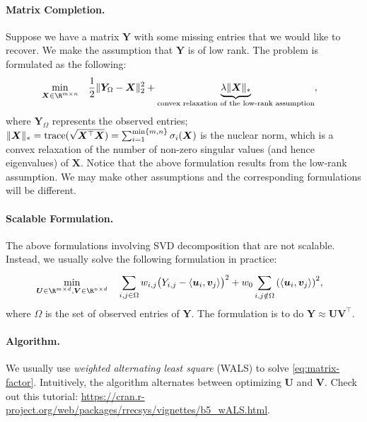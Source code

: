 {        \paragraph{Matrix Completion.} 
        Suppose we have a matrix $\bm{Y}$ with some missing entries that we would like to recover. 
        We make the assumption that $\bm{Y}$ is of low rank.
        The problem is formulated as the following:
            \begin{equation}
                \begin{aligned}
                            & \min_{\bm{X} \in \R^{m \times n}} & & \frac{1}{2}\norm{\bm{Y}_\Omega - \bm{X}}_2^2 + \underbrace{\lambda \norm{\bm{X}}_\ast}_{\text{convex relaxation of the low-rank assumption}},
                \end{aligned}
            \end{equation}
        where $\bm{Y}_\Omega$ represents the observed entries; $\lVert\bm{X}\rVert_\ast = \text{trace}(\sqrt{\bm{X}^\top \bm{X}}) = \sum_{i=1}^{\min \{ m, n \}}{\sigma_i(\bm{X})}$ is the nuclear norm, which is a convex relaxation of the number of non-zero singular values (and hence eigenvalues) of $\bm{X}$.
        Notice that the above formulation results from the low-rank assumption.
        We may make other assumptions and the corresponding formulations will be different. 
    
        \paragraph{Scalable Formulation.} 
        The above formulations involving SVD decomposition that are not scalable.
        Instead, we usually solve the following formulation in practice:
            \begin{equation}\label{eq:matrix-factor}
                \begin{aligned}
                            & \min_{\bm{U} \in \R^{m \times d}, \bm{V} \in \R^{n \times d}} & & \sum_{i, j\in \Omega}^{}{ w_{i,j} \big(Y_{i,j} - \langle \bm{u}_i, \bm{v}_j \rangle \big)^2 +  w_0 \sum_{i,j \notin \Omega }^{}{ \left( \langle \bm{u}_i, \bm{v}_j \rangle \right)^2} },
                \end{aligned}
            \end{equation}
        where $\Omega$ is the set of observed entries of $\bm{Y}$.
        The formulation is to do $\bm{Y} \approx \bm{U} \bm{V}^\top$.
        
        \paragraph{Algorithm.} 
        We usually use \emph{weighted alternating least square} (WALS) to solve \eqref{eq:matrix-factor}.
        Intuitively, the algorithm alternates between optimizing $\bm{U}$ and $\bm{V}$.
        Check out this tutorial: \url{https://cran.r-project.org/web/packages/rrecsys/vignettes/b5_wALS.html}.
    
}
